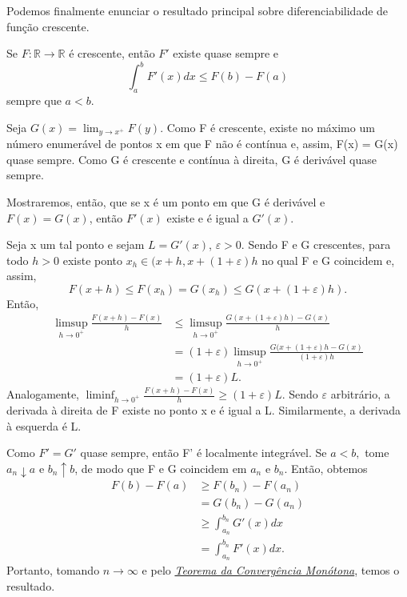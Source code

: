\documentclass[MeasureTheory/measure_theory.tex]{subfiles}
\begin{document}
Podemos finalmente enunciar o resultado principal sobre diferenciabilidade de função crescente.
\begin{theorem*}
	Se \(F:\mathbb{R}\rightarrow \mathbb{R}\) é crescente, então \(F'\) existe quase sempre e
	\[
		\int_{a}^{b}F'(x)dx \leq F(b) - F(a)
	\]
	sempre que \(a < b.\)
\end{theorem*}
\begin{proof*}
	Seja \(G(x) = \lim_{y\to x^{+}}F(y).\) Como F é crescente, existe no máximo um número enumerável de pontos x em que F não é contínua e, assim, F(x) = G(x) quase sempre.
	Como G é crescente e contínua à direita, G é derivável quase sempre.

	Mostraremos, então, que se x é um ponto em que G é derivável e \(F(x) = G(x)\), então \(F'(x)\) existe e é igual a \(G'(x).\)

	Seja x um tal ponto e sejam \(L = G'(x)\), \(\varepsilon > 0.\) Sendo F e G crescentes, para todo \(h > 0\) existe ponto \(x_{h}\in (x+h, x + (1+\varepsilon )h\) no qual F e G coincidem e, assim,
	\[
		F(x+h) \leq F(x_{h}) = G(x_{h}) \leq G(x+(1+\varepsilon )h).
	\]
	Então,
	\begin{align*}
		\limsup_{h\to 0^{+}}\frac{F(x+h) - F(x)}{h} & \leq \limsup_{h\to 0^{+}}\frac{G(x+(1+\varepsilon )h)-G(x)}{h}                               \\
		                                            & = (1+\varepsilon )\limsup_{h\to 0^{+}}\frac{G(x+(1+\varepsilon )h - G(x)}{(1+\varepsilon )h} \\
		                                            & = (1+\varepsilon )L.
	\end{align*}
	Analogamente, \(\liminf_{h\to 0^{+}}\frac{F(x+h)-F(x)}{h}\geq (1+\varepsilon )L.\) Sendo \(\varepsilon \) arbitrário, a derivada à direita de F existe no ponto x e é igual a L. Similarmente, a derivada à esquerda é L.

	Como \(F'=G'\) quase sempre, então F' é localmente integrável. Se \(a < b,\) tome \(a_{n}\downarrow a\) e \(b_{n}\uparrow b\), de modo que F e G coincidem em \(a_{n}\) e \(b_{n}\). Então, obtemos
	\begin{align*}
		F(b) - F(a) & \geq F(b_{n}) - F(a_{n})         \\
		            & = G(b_{n}) - G(a_{n})            \\
		            & \geq \int_{a_{n}}^{b_{n}}G'(x)dx \\
		            & = \int_{a_{n}}^{b_{n}}F'(x)dx.
	\end{align*}
	Portanto, tomando \(n\to \infty\) e pelo \hyperlink{monotone_convergence}{\textit{Teorema da Convergência Monótona}}, temos o resultado. \qedsymbol
\end{proof*}
\end{document}
